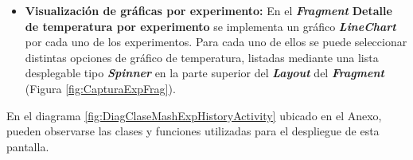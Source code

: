 \begin{itemize}
                 \item \textbf{Visualización de gráficas por experimento:} En el \textbf{\textit{\gls{Fragment}}} \textbf{Detalle de temperatura por experimento} se implementa un gráfico \textbf{\textit{\gls{LineChart}}} por cada uno de los experimentos. Para cada uno de ellos se puede seleccionar distintas opciones de gráfico de temperatura, listadas mediante una lista desplegable tipo \textbf{\textit{\gls{Spinner}}} en la parte superior del \textbf{\textit{\gls{Layout}}} del \textbf{\textit{\gls{Fragment}}} (Figura \ref{fig:CapturaExpFrag}).
             \end{itemize}
             
            \par En el diagrama \ref{fig:DiagClaseMashExpHistoryActivity} ubicado en el Anexo, pueden observarse las clases y funciones utilizadas para el despliegue de esta pantalla.
            
            
            
